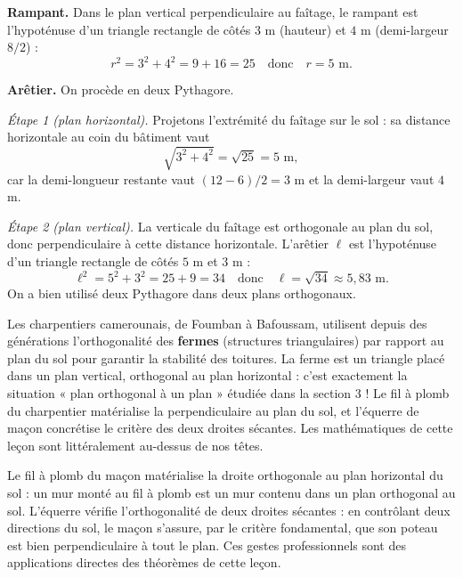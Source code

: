 \documentclass[11pt]{article}
\newcommand{\cle}[1]{{\popxbold\color{popdark}#1}}
\begin{document}
\begin{corrige}
\textbf{Rampant.} Dans le plan vertical perpendiculaire au faîtage, le rampant est l'hypoténuse d'un triangle rectangle de côtés $3$ m (hauteur) et $4$ m (demi-largeur $8/2$) :
\[ r^2 = 3^2 + 4^2 = 9 + 16 = 25 \quad \text{donc} \quad r = 5 \text{ m}. \]

\textbf{Arêtier.} On procède en deux Pythagore.

\emph{Étape 1 (plan horizontal).} Projetons l'extrémité du faîtage sur le sol : sa distance horizontale au coin du bâtiment vaut
\[ \sqrt{3^2 + 4^2} = \sqrt{25} = 5 \text{ m}, \]
car la demi-longueur restante vaut $(12-6)/2 = 3$ m et la demi-largeur vaut $4$ m.

\emph{Étape 2 (plan vertical).} La verticale du faîtage est orthogonale au plan du sol, donc perpendiculaire à cette distance horizontale. L'arêtier $\ell$ est l'hypoténuse d'un triangle rectangle de côtés $5$ m et $3$ m :
\[ \ell^2 = 5^2 + 3^2 = 25 + 9 = 34 \quad \text{donc} \quad \ell = \sqrt{34} \approx 5{,}83 \text{ m}. \]
On a bien utilisé deux Pythagore dans deux plans orthogonaux.
\end{corrige}

\begin{savaistu}
Les charpentiers camerounais, de Foumban à Bafoussam, utilisent depuis des générations l'orthogonalité des \textbf{fermes} (structures triangulaires) par rapport au plan du sol pour garantir la stabilité des toitures. La ferme est un triangle placé dans un plan vertical, orthogonal au plan horizontal : c'est exactement la situation « plan orthogonal à un plan » étudiée dans la section 3 ! Le fil à plomb du charpentier matérialise la perpendiculaire au plan du sol, et l'équerre de maçon concrétise le critère des deux droites sécantes. Les mathématiques de cette leçon sont littéralement au-dessus de nos têtes.
\end{savaistu}

\begin{savaistu}
Le \cle{fil à plomb} du maçon matérialise la droite orthogonale au plan horizontal du sol : un mur monté au fil à plomb est un mur contenu dans un plan orthogonal au sol. L'\cle{équerre} vérifie l'orthogonalité de deux droites sécantes : en contrôlant deux directions du sol, le maçon s'assure, par le critère fondamental, que son poteau est bien perpendiculaire à tout le plan. Ces gestes professionnels sont des applications directes des théorèmes de cette leçon.
\end{savaistu}
\end{document}
